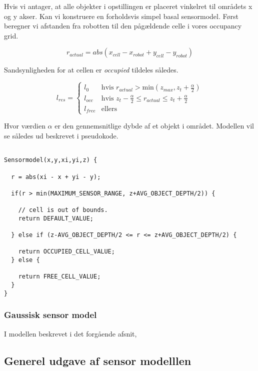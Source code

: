 Hvis vi antager, at alle objekter i opstillingen er placeret vinkelret til områdets x og y akser.
Kan vi konstruere en forholdsvis simpel basal sensormodel.
Først beregner vi afstanden fra robotten til den pågældende celle i vores occupancy grid.

$$r_{actual} = abs(x_{cell} - x_{robot} + y_{cell} - y_{robot})$$

Sandsynligheden for at cellen er  \emph{occupied} tildeles således.

$$l_{res} = \begin{cases} 
	l_0 &\text{hvis }r_{actual} > \text{min}(z_{max},z_t+\frac{\alpha}{2}) \\ 
	l_{occ} &\text{hvis } z_t-\frac{\alpha}{2} \leq r_{actual} \leq z_t+\frac{\alpha}{2}\\ 
	l_{free} &\text{ellers}  
\end{cases}$$

Hvor værdien $\alpha$ er den gennemsnitlige dybde af et objekt i området.
Modellen vil se således ud beskrevet i pseudokode.

\begin{lstlisting}[style=c, caption={Basal Sensor Model}, breaklines=true]

Sensormodel(x,y,xi,yi,z) {

  r = abs(xi - x + yi - y);  
  
  if(r > min(MAXIMUM_SENSOR_RANGE, z+AVG_OBJECT_DEPTH/2)) {
  
    // cell is out of bounds.
    return DEFAULT_VALUE;
    
  } else if (z-AVG_OBJECT_DEPTH/2 <= r <= z+AVG_OBJECT_DEPTH/2) {

    return OCCUPIED_CELL_VALUE;
  } else {    
    
  	return FREE_CELL_VALUE;
  }
}
\end{lstlisting}

\subsubsection{Gaussisk sensor model}

I modellen beskrevet i det forgående afsnit, 





\subsection{Generel udgave af sensor modelllen}

